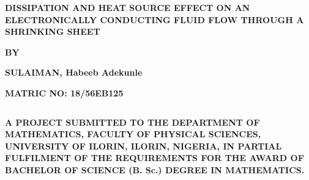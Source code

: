 \documentclass[a4paper,12pt]{report}
\begin{document}
\newpage
{}
\newcommand{\np}{\newpage}

\begin{titlepage}
		\begin{center} 
		\textbf{\Large DISSIPATION AND HEAT SOURCE EFFECT ON AN ELECTRONICALLY CONDUCTING FLUID FLOW THROUGH A SHRINKING SHEET} 
		\end{center}
			\begin{center}	                    \textbf{\emph\large BY}		                               \end{center}
\begin{center}    				
\textbf{\large SULAIMAN, Habeeb Adekunle}               \end{center}
			\begin{center} 		           \textbf{\upshape MATRIC NO: 18/56EB125}															             \end{center}
$$$$%
			\begin{center}      \textbf{A PROJECT SUBMITTED TO THE DEPARTMENT OF MATHEMATICS, FACULTY OF PHYSICAL SCIENCES, UNIVERSITY OF ILORIN, ILORIN, NIGERIA, IN PARTIAL FULFILMENT OF THE  REQUIREMENTS FOR THE AWARD OF BACHELOR OF SCIENCE (B. Sc.) DEGREE IN MATHEMATICS.}
		\end{center}
		
		
		
\begin{center}       
\vspace{2in}\date \textbf{\today}
\end{center}
\end{titlepage}
 
\end{document}
